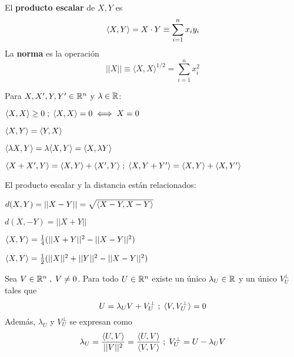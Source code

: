  El \textbf{producto escalar} de $X,Y$ es
$$\langle X,Y \rangle = X\cdot Y \equiv \sum_{i = 1}^nx_iy_i$$
La \textbf{norma} es la operación 
$$||X||\equiv \langle X,X \rangle^{1/2} = \sum_{i = 1}^nx_i^2$$

 Para $X,X',Y,Y' \in \mathbb{R}^n$ y $\lambda \in \mathbb{R}$:
\begin{itemizex}
	\item $\langle X,X \rangle \ge 0 \; ;\; \langle X,X \rangle = 0 \iff X = 0$
	\item $\langle X,Y \rangle = \langle Y,X \rangle$
	\item $\langle \lambda X, Y \rangle = \lambda \langle X,Y \rangle = \langle X, \lambda Y \rangle$
	\item $\langle X+X' , Y \rangle = \langle X,Y \rangle+\langle X',Y \rangle\;;\;
	\langle X , Y+Y' \rangle = \langle X,Y \rangle+\langle X,Y' \rangle$
\end{itemizex}

 El producto escalar y la distancia están relacionados:
\begin{itemizex}
	\item $d(X,Y) = ||X-Y|| = \sqrt{\langle X-Y,X-Y \rangle}$
	\item $d(X,-Y) = ||X+Y||$
	\item $\langle  X, Y \rangle = \frac{1}{4}(||X+Y||^2 - ||X-Y||^2)$
	\item $\langle X, Y \rangle = \frac{1}{2}(||X||^2 + ||Y||^2 - ||X-Y||^2)$
\end{itemizex}

  Sea $V \in \mathbb{R}^n\;, \;V \neq 0$. Para todo $U \in \mathbb{R}^n$ existe un único $\lambda_U \in \mathbb{R}$ y un único $V_{U}^\perp$ tales que
$$U = \lambda_UV + V_{U}^\perp\;;\; \langle V, V_{U}^\perp \rangle = 0$$
Además, $\lambda_U$ y $V_U^\perp$ se expresan como
$$\lambda_U= \frac{\langle U,V \rangle}{||V||^2} = \frac{\langle U,V \rangle}{\langle V,V \rangle}\;;\; V_U^\perp = U - \lambda_UV$$

